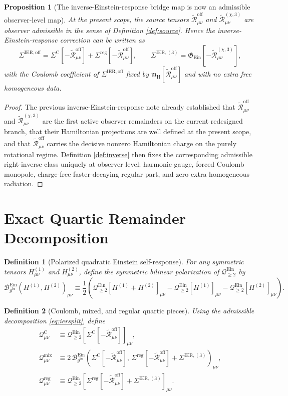 \documentclass[11pt]{article}
\newcommand{\ReBridge}{g^{\mathrm{br}}}
\newcommand{\SigmaOff}{\Sigma^{\mathrm{IER,off}}}
\newcommand{\SigmaLongThree}{\Sigma^{\mathrm{IER},(3)}}
\newcommand{\SigmaC}{\Sigma^{\mathrm{C}}}
\newcommand{\SigmaReg}{\Sigma^{\mathrm{reg}}}
\newcommand{\ReOff}{\widetilde{\mathcal R}_{\mu\nu}^{\mathrm{off}}}
\newcommand{\ReLongThree}{\widetilde{\mathcal R}_{\mu\nu}^{(\chi,3)}}
\newcommand{\EinQuad}{\mathcal Q_{\ge 2}^{\mathrm{Ein}}}
\newcommand{\EinInv}{\mathfrak G_{\mathrm{Ein}}}
\newcommand{\EinBil}{\mathcal B_{\ReBridge}^{\mathrm{Ein}}}
\newcommand{\HamCharge}{\mathfrak m_{\mathrm H}}
\newtheorem{definition}{Definition}
\newtheorem{proposition}{Proposition}
\begin{document}
\begin{proposition}[The inverse-Einstein-response bridge map is now an admissible observer-level map]
\label{prop:adm}
At the present scope, the source tensors \(\ReOff\) and \(\ReLongThree\) are observer admissible in the sense of Definition \ref{def:source}. Hence the inverse-Einstein-response correction can be written as
\begin{equation}
\SigmaOff=\SigmaC[-\ReOff]+\SigmaReg[-\ReOff],
\qquad
\SigmaLongThree=\EinInv[-\ReLongThree],
\label{eq:iersplit}
\end{equation}
with the Coulomb coefficient of \(\SigmaOff\) fixed by \(\HamCharge[\ReOff]\) and with no extra free homogeneous data.
\end{proposition}

\begin{proof}
The previous inverse-Einstein-response note already established that \(\ReOff\) and \(\ReLongThree\) are the first active observer remainders on the current redesigned branch, that their Hamiltonian projections are well defined at the present scope, and that \(\ReOff\) carries the decisive nonzero Hamiltonian charge on the purely rotational regime. Definition \ref{def:inverse} then fixes the corresponding admissible right-inverse class uniquely at observer level: harmonic gauge, forced Coulomb monopole, charge-free faster-decaying regular part, and zero extra homogeneous radiation.
\end{proof}

\section{Exact Quartic Remainder Decomposition}

\begin{definition}[Polarized quadratic Einstein self-response]
\label{def:bil}
For any symmetric tensors \(H^{(1)}_{\mu\nu}\) and \(H^{(2)}_{\mu\nu}\), define the symmetric bilinear polarization of \(\EinQuad\) by
\begin{equation}
\EinBil(H^{(1)},H^{(2)})_{\mu\nu}
\equiv
\frac12
\left(
\EinQuad[H^{(1)}+H^{(2)}]_{\mu\nu}
-\EinQuad[H^{(1)}]_{\mu\nu}
-\EinQuad[H^{(2)}]_{\mu\nu}
\right).
\label{eq:bil}
\end{equation}
\end{definition}

\begin{definition}[Coulomb, mixed, and regular quartic pieces]
\label{def:qpieces}
Using the admissible decomposition \eqref{eq:iersplit}, define
\begin{align}
\mathcal Q_{\mu\nu}^{\mathrm C}
&\equiv
\EinQuad[\SigmaC[-\ReOff]]_{\mu\nu},
\label{eq:QC}
\\
\mathcal Q_{\mu\nu}^{\mathrm{mix}}
&\equiv
2\,\EinBil\!\left(\SigmaC[-\ReOff],\,\SigmaReg[-\ReOff]+\SigmaLongThree\right)_{\mu\nu},
\label{eq:Qmix}
\\
\mathcal Q_{\mu\nu}^{\mathrm{reg}}
&\equiv
\EinQuad[\SigmaReg[-\ReOff]+\SigmaLongThree]_{\mu\nu}.
\label{eq:Qreg}
\end{align}
\end{definition}
\end{document}
